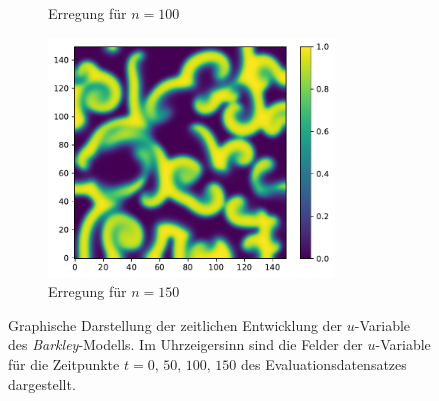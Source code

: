 \begin{appendices}
\begin{figure}[h]
\begin{subfigure}{.5\textwidth}
		\setcapmargin[1cm]{0.5cm}
		\caption{Erregung für $n=100$}
	\end{subfigure}%
	\begin{subfigure}{.5\textwidth}
		\centering
		\includegraphics[height=2.5in]{figures/results/dynamics/barkley_150.pdf}
		\setcapmargin[1cm]{0.5cm}
		\caption{Erregung für $n=150$}
	\end{subfigure}
	\caption{Graphische Darstellung der zeitlichen Entwicklung der $u$-Variable des \textit{Barkley}-Modells. Im Uhrzeigersinn sind die Felder der $u$-Variable für die Zeitpunkte $t=0,\, 50,\, 100,\, 150$ des Evaluationsdatensatzes dargestellt.}
	\label{fig:apx_barkley_evolution}
\end{figure} 


\end{appendices}
